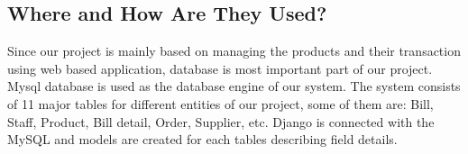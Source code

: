\subsection{Where and How Are They Used?}

Since our project is mainly based on
managing the products and their transaction using web based application,
database is most important part of our project. Mysql database is used as
the database engine of our system. The system consists of 11 major tables
for different entities of our project, some of them are: Bill, Staff,
Product, Bill detail, Order, Supplier, etc. Django is connected with the
MySQL and models are created for each tables describing field details.

